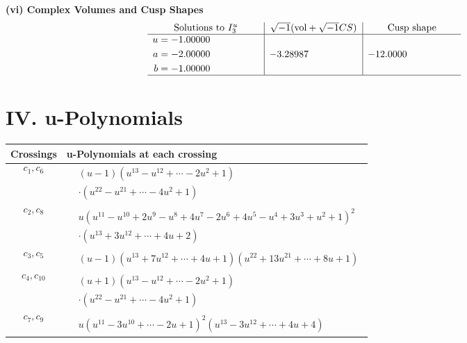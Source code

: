 \documentclass[1p]{elsarticle_modified}
\theoremstyle{definition}
\newcommand{\I}{\sqrt{-1}}
\begin{document}
\newpage\flushleft \textbf{(vi) Complex Volumes and Cusp Shapes}
$$\begin{array}{c|c|c}  
\text{Solutions to }I^u_{3}& \I (\text{vol} + \sqrt{-1}CS) & \text{Cusp shape}\\
 \hline 
\begin{aligned}
u &= -1.00000\phantom{ +0.000000I} \\
a &= -2.00000\phantom{ +0.000000I} \\
b &= -1.00000\phantom{ +0.000000I}\end{aligned}
 & -3.28987\phantom{ +0.000000I} & -12.0000\phantom{ +0.000000I}\\
 \hline 
 \end{array}$$\newpage
\newpage\renewcommand{\arraystretch}{1}
\centering \section*{ IV. u-Polynomials}
\begin{tabular}{m{50pt}|m{274pt}}
Crossings & \hspace{64pt}u-Polynomials at each crossing \\
\hline $$\begin{aligned}c_{1},c_{6}\end{aligned}$$&$\begin{aligned}
&(u-1)(u^{13}- u^{12}+\cdots-2 u^2+1)\\
&\cdot(u^{22}- u^{21}+\cdots-4 u^2+1)
\end{aligned}$\\
\hline $$\begin{aligned}c_{2},c_{8}\end{aligned}$$&$\begin{aligned}
&u(u^{11}- u^{10}+2 u^9- u^8+4 u^7-2 u^6+4 u^5- u^4+3 u^3+u^2+1)^2\\
&\cdot(u^{13}+3 u^{12}+\cdots+4 u+2)
\end{aligned}$\\
\hline $$\begin{aligned}c_{3},c_{5}\end{aligned}$$&$\begin{aligned}
&(u-1)(u^{13}+7 u^{12}+\cdots+4 u+1)(u^{22}+13 u^{21}+\cdots+8 u+1)
\end{aligned}$\\
\hline $$\begin{aligned}c_{4},c_{10}\end{aligned}$$&$\begin{aligned}
&(u+1)(u^{13}- u^{12}+\cdots-2 u^2+1)\\
&\cdot(u^{22}- u^{21}+\cdots-4 u^2+1)
\end{aligned}$\\
\hline $$\begin{aligned}c_{7},c_{9}\end{aligned}$$&$\begin{aligned}
&u(u^{11}-3 u^{10}+\cdots-2 u+1)^{2}(u^{13}-3 u^{12}+\cdots+4 u+4)
\end{aligned}$\\
\hline
\end{tabular}\newpage\renewcommand{\arraystretch}{1}
\end{document}
